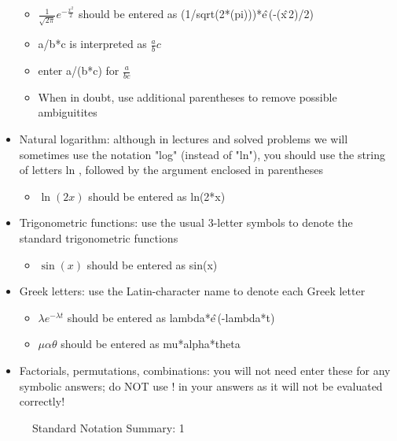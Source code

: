 \documentclass[pdftex, brazil, 12pt, twoside]{article}
\begin{document}
\begin{itemize}[noitemsep]
  \begin{itemize}[noitemsep]
  \item $\displaystyle \frac{1}{\sqrt{2\pi}}e^{-\frac{x^2}{2}}$ should be entered
    as (1/sqrt(2*(pi)))*e\^\,(-(x\^\,2)/2)
  \item a/b*c is interpreted as $\frac{a}{b}c$
  \item enter a/(b*c) for $\frac{a}{bc}$
  \item When in doubt, use additional parentheses to remove
    possible ambiguitites
  \end{itemize}
\item Natural logarithm: although in lectures and solved problems we will
  sometimes use the notation "log" (instead of "ln"), you should use the
  string of letters ln , followed by the argument enclosed in parentheses
  \begin{itemize}[noitemsep]
  \item $\ln{(2x)}$ should be entered as ln(2*x)
  \end{itemize}
\item Trigonometric functions: use the usual 3-letter symbols to denote
  the standard trigonometric functions
  \begin{itemize}[noitemsep]
  \item $\sin{(x)}$ should be entered as sin(x)
  \end{itemize}
\item Greek letters: use the Latin-character name to denote each Greek letter
  \begin{itemize}[noitemsep]
  \item $\lambda e^{-\lambda t}$ should be entered as lambda*e\^\,(-lambda*t)
  \item $\mu \alpha \theta$ should be entered as mu*alpha*theta
  \end{itemize}
\item Factorials, permutations, combinations: you will not need enter these
  for any symbolic answers; do NOT use ! in your answers as it will not be evaluated correctly!
\end{itemize}

\begin{figure}[H]
  \begin{center}
    \caption{Standard Notation Summary: 1}
    \label{fig:std-ntt-1}
  \end{center}
\end{figure}
\end{document}
